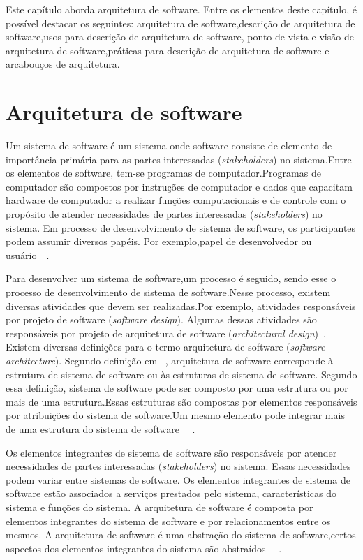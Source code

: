 Este capítulo aborda arquitetura de software. Entre os elementos deste capítulo, é possível destacar os seguintes: arquitetura de software,descrição de arquitetura de software,usos para  descrição de arquitetura de software, ponto de vista e visão de arquitetura de software,práticas para descrição de arquitetura de software e arcabouços de arquitetura.

\section{Arquitetura de software}

Um sistema de software é um sistema onde software consiste de elemento de importância primária para as partes interessadas (\emph{stakeholders}) no sistema.Entre os elementos de software, tem-se programas de computador.Programas de computador são compostos por instruções de computador e dados que capacitam hardware de computador a realizar funções computacionais e de controle com o propósito de atender necessidades de partes interessadas (\emph{stakeholders}) no sistema. Em processo de desenvolvimento de sistema de software, os participantes podem assumir diversos papéis. Por exemplo,papel de desenvolvedor ou usuário~\cite{Sevocab}~\cite{ISO_24765}.

Para desenvolver um sistema de software,um processo é seguido, sendo esse o processo de desenvolvimento de sistema de software.Nesse processo, existem diversas atividades que devem ser realizadas.Por exemplo, atividades responsáveis por projeto de software (\emph{software design}). Algumas dessas atividades  são responsáveis por projeto de arquitetura de software (\emph{architectural design})~\cite{Sommerville_2011_texbook}. Existem diversas definições para o termo arquitetura de software (\emph{software architecture}). Segundo definição em ~\cite{arq_01}, arquitetura de software corresponde à estrutura de sistema de software ou às estruturas de sistema de software. Segundo essa definição, sistema de software pode ser composto por uma estrutura ou por mais de uma estrutura.Essas estruturas são compostas por elementos responsáveis por atribuições do sistema de software.Um mesmo elemento pode integrar mais de uma estrutura do sistema de software ~\cite{arq_01}~\cite{Carnegie_textbook}.

Os elementos integrantes de sistema de software são responsáveis
por atender necessidades de partes interessadas (\emph{stakeholders}) no sistema. 
Essas necessidades podem variar entre sistemas de software. Os elementos integrantes de sistema de software estão associados a serviços prestados pelo sistema, características do sistema e funções do sistema. A arquitetura de software é composta por elementos integrantes do sistema de software e por relacionamentos entre os mesmos. A arquitetura de software é uma abstração do sistema de software,certos aspectos dos elementos integrantes do sistema são abstraídos ~\cite{arq_01}~\cite{Carnegie_textbook}.


